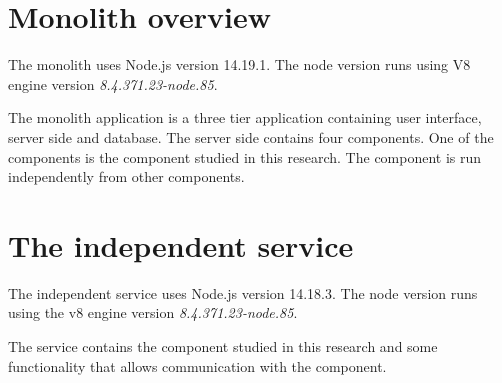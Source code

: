 \section{Monolith overview}
The monolith uses Node.js version 14.19.1. The node version runs using V8 engine version \textit{8.4.371.23-node.85}.

The monolith application is a three tier application containing user interface, server side and database.
The server side contains four components.
One of the components is the component studied in this research.
The component is run independently from other components.

\section{The independent service}
The independent service uses Node.js version 14.18.3.
The node version runs using the v8 engine version \textit{8.4.371.23-node.85}.

The service contains the component studied in this research and some functionality that allows communication with the component.
